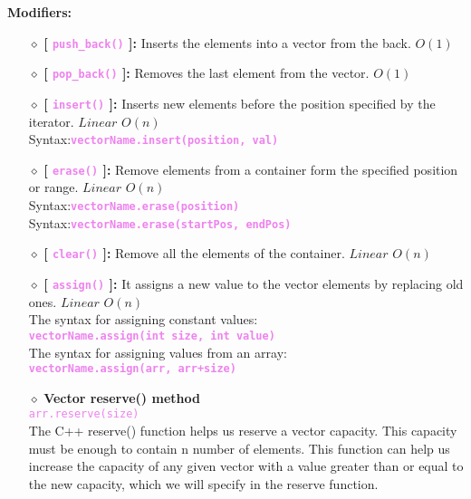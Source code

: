 \begin{center}
	\textbf{Modifiers:}
\end{center}
\begin{itemize}

	\item[{\LARGE $\diamond$}] \textbf{[ \textcolor{violet}{\texttt{push\_back()}} ]:} Inserts the elements into a vector from the back. $O(1)$
	
	\item[{\LARGE $\diamond$}] \textbf{[ \textcolor{violet}{\texttt{pop\_back()}} ]:} Removes the last element from the vector. $O(1)$
	
	\item[{\LARGE $\diamond$}] \textbf{[ \textcolor{violet}{\texttt{insert()}} ]:} Inserts new elements before the position specified by the iterator. $Linear$ $O(n)$\\
	\tab Syntax:\tab \textbf{\textcolor{violet}{\texttt{vectorName.insert(position, val)}}}
	
	\item[{\LARGE $\diamond$}] \textbf{[ \textcolor{violet}{\texttt{erase()}} ]:} Remove elements from a container form the specified position or range. $Linear$ $O(n)$\\
	\tab Syntax:\tab \textbf{\textcolor{violet}{\texttt{vectorName.erase(position)}}}\\
	\tab Syntax:\tab \textbf{\textcolor{violet}{\texttt{vectorName.erase(startPos, endPos)}}}
	
	\item[{\LARGE $\diamond$}] \textbf{[ \textcolor{violet}{\texttt{clear()}} ]:} Remove all the elements of the container. $Linear$ $O(n)$
	
	\item[{\LARGE $\diamond$}] \textbf{[ \textcolor{violet}{\texttt{assign()}} ]:} It assigns a new value to the vector elements by replacing old ones. $Linear$ $O(n)$\\
	\tab The syntax for assigning constant values:\\
	\tab \textbf{\textcolor{violet}{\texttt{vectorName.assign(int size, int value)}}}\\
	
	\tab The syntax for assigning values from an array:\\
	\tab \textbf{\textcolor{violet}{\texttt{vectorName.assign(arr, arr+size)}}}\\
	
	\item[{\LARGE$\diamond$}] \textbf{Vector reserve() method} \\
		\tab\textcolor{violet}{\texttt{arr.reserve(size)}}\\
		The C++ reserve() function helps us reserve a vector capacity. This capacity must be enough to contain n number of elements. This function can help us increase the capacity of any given vector with a value greater than or equal to the new capacity, which we will specify in the reserve function.
	
\end{itemize}

